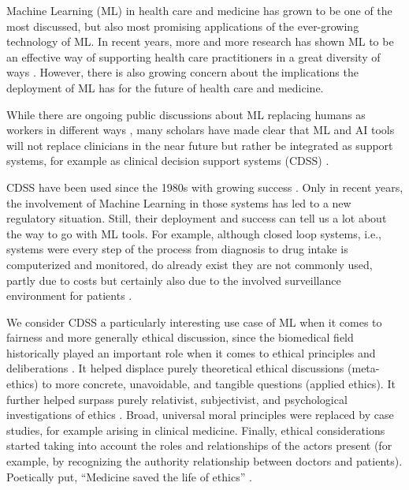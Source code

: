 Machine Learning (ML) in health care and medicine has grown to be one of the most discussed, but also most promising applications of the ever-growing technology of ML.
In recent years, more and more research has shown ML to be an effective way of supporting health care practitioners in a great diversity of ways \cite{rajpurkar2022ai, topol2019high}.
However, there is also growing concern about the implications the deployment of ML has for the future of health care and medicine. 

While there are ongoing public discussions about ML replacing humans as workers in different ways \cite{rinehart2019understanding}, many scholars have made clear that ML and AI tools will not replace clinicians in the near future but rather be integrated as support systems, for example as clinical decision support systems (CDSS) \cite{Morley2020}.

CDSS have been used since the 1980s with growing success \cite{sutton2020overview}.
Only in recent years, the involvement of Machine Learning in those systems has led to a new regulatory situation.
Still, their deployment and success can tell us a lot about the way to go with ML tools.
For example, although closed loop systems, i.e., systems were every step of the process from diagnosis to drug intake is computerized and monitored, do already exist they are not commonly used, partly due to costs but certainly also due to the involved surveillance environment for patients \cite{sutton2020overview}. 

We consider CDSS a particularly interesting use case of ML when it comes to fairness and more generally ethical discussion, since the biomedical field historically played an important role when it comes to ethical principles and deliberations \cite{Toulmin1982, Hardin1989}.
It helped displace purely theoretical ethical discussions (meta-ethics) to more concrete, unavoidable, and tangible questions (applied ethics).
It further helped surpass purely relativist, subjectivist, and psychological investigations of ethics \cite{Toulmin1982}.
Broad, universal moral principles were replaced by case studies, for example arising in clinical medicine.
Finally, ethical considerations started taking into account the roles and relationships of the actors present (for example, by recognizing the authority relationship between doctors and patients).
Poetically put, ``Medicine saved the life of ethics'' \cite{Toulmin1982}.

